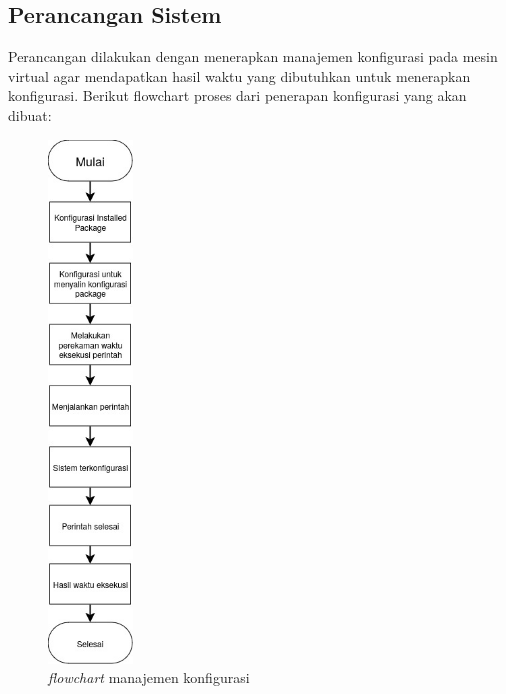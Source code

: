 \documentclass[10pt,]{report}
\begin{document}
\begin{adjustwidth}{7mm}{}
	\subsection{Perancangan Sistem}
	\vspace{-3mm}
	\begin{adjustwidth}{6mm}{}
		Perancangan dilakukan dengan menerapkan manajemen konfigurasi pada mesin
		virtual agar mendapatkan hasil waktu yang dibutuhkan untuk menerapkan
		konfigurasi. Berikut flowchart proses dari penerapan konfigurasi yang akan
		dibuat:
		\begin{figure}[!htb]
			\centering
			\includegraphics[width=0.2\textwidth]{images/flow.jpg}
			\caption{\textit{flowchart} manajemen konfigurasi}
		\end{figure}
	\end{adjustwidth}
\end{adjustwidth}
\newpage
\end{document}
